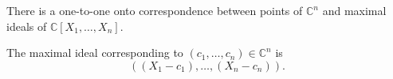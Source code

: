 There is a one-to-one onto correspondence between points of $\mathbb{C}^n$ and maximal ideals of $\mathbb{C}[X_1, \ldots, X_n]$.

The maximal ideal corresponding to $(c_1, \ldots, c_n) \in \mathbb{C}^n$ is
$$((X_1 - c_1), \ldots, (X_n - c_n)).$$
